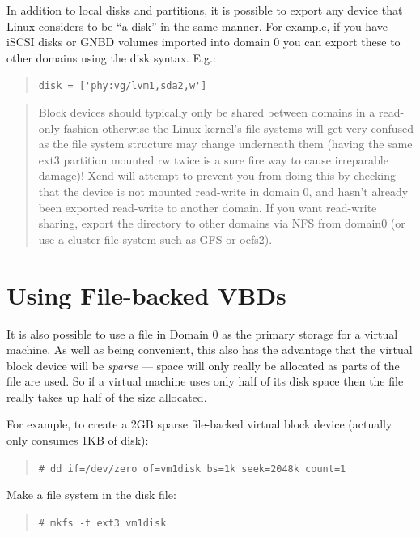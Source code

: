 \documentclass[11pt,twoside,final,openright]{report}
\def\Xend{{Xend}\xspace}
\begin{document}
In addition to local disks and partitions, it is possible to export
any device that Linux considers to be ``a disk'' in the same manner.
For example, if you have iSCSI disks or GNBD volumes imported into
domain 0 you can export these to other domains using the 
disk syntax. E.g.:
\begin{quote}
\verb_disk = ['phy:vg/lvm1,sda2,w']_
\end{quote}



\begin{center}
\end{center}
\begin{quote}
Block devices should typically only be shared between domains in a
read-only fashion otherwise the Linux kernel's file systems will get
very confused as the file system structure may change underneath them
(having the same ext3 partition mounted rw twice is a sure fire way to
cause irreparable damage)!  \Xend will attempt to prevent you from
doing this by checking that the device is not mounted read-write in
domain 0, and hasn't already been exported read-write to another
domain.
If you want read-write sharing, export the directory to other domains
via NFS from domain0 (or use a cluster file system such as GFS or
ocfs2).

\end{quote}


\section{Using File-backed VBDs}

It is also possible to use a file in Domain 0 as the primary storage
for a virtual machine.  As well as being convenient, this also has the
advantage that the virtual block device will be {\em sparse} --- space
will only really be allocated as parts of the file are used.  So if a
virtual machine uses only half of its disk space then the file really
takes up half of the size allocated.

For example, to create a 2GB sparse file-backed virtual block device
(actually only consumes 1KB of disk):
\begin{quote}
\verb_# dd if=/dev/zero of=vm1disk bs=1k seek=2048k count=1_
\end{quote}

Make a file system in the disk file: 
\begin{quote}
\verb_# mkfs -t ext3 vm1disk_
\end{quote}
\end{document}
